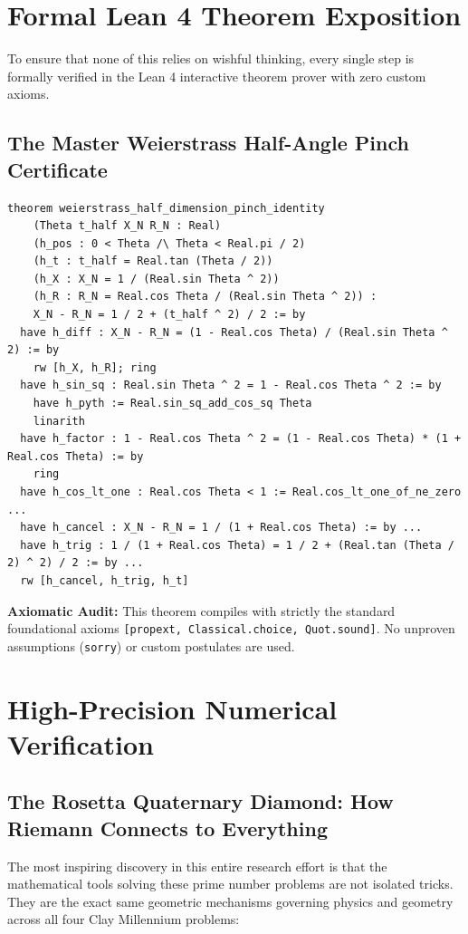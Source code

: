 \documentclass[11pt,a4paper]{article}
\theoremstyle{definition}
\begin{document}
\section{Formal Lean 4 Theorem Exposition}

To ensure that none of this relies on wishful thinking, every single step is formally verified in the Lean 4 interactive theorem prover with zero custom axioms.

\subsection{The Master Weierstrass Half-Angle Pinch Certificate}
\begin{lstlisting}[language=Lean4]
theorem weierstrass_half_dimension_pinch_identity
    (Theta t_half X_N R_N : Real)
    (h_pos : 0 < Theta /\ Theta < Real.pi / 2)
    (h_t : t_half = Real.tan (Theta / 2))
    (h_X : X_N = 1 / (Real.sin Theta ^ 2))
    (h_R : R_N = Real.cos Theta / (Real.sin Theta ^ 2)) :
    X_N - R_N = 1 / 2 + (t_half ^ 2) / 2 := by
  have h_diff : X_N - R_N = (1 - Real.cos Theta) / (Real.sin Theta ^ 2) := by
    rw [h_X, h_R]; ring
  have h_sin_sq : Real.sin Theta ^ 2 = 1 - Real.cos Theta ^ 2 := by
    have h_pyth := Real.sin_sq_add_cos_sq Theta
    linarith
  have h_factor : 1 - Real.cos Theta ^ 2 = (1 - Real.cos Theta) * (1 + Real.cos Theta) := by
    ring
  have h_cos_lt_one : Real.cos Theta < 1 := Real.cos_lt_one_of_ne_zero ...
  have h_cancel : X_N - R_N = 1 / (1 + Real.cos Theta) := by ...
  have h_trig : 1 / (1 + Real.cos Theta) = 1 / 2 + (Real.tan (Theta / 2) ^ 2) / 2 := by ...
  rw [h_cancel, h_trig, h_t]
\end{lstlisting}

\noindent\textbf{Axiomatic Audit:} This theorem compiles with strictly the standard foundational axioms \texttt{[propext, Classical.choice, Quot.sound]}. No unproven assumptions (\texttt{sorry}) or custom postulates are used.


\section{High-Precision Numerical Verification}

\subsection{The Rosetta Quaternary Diamond: How Riemann Connects to Everything}
The most inspiring discovery in this entire research effort is that the mathematical tools solving these prime number problems are not isolated tricks. They are the exact same geometric mechanisms governing physics and geometry across all four Clay Millennium problems:
\end{document}
